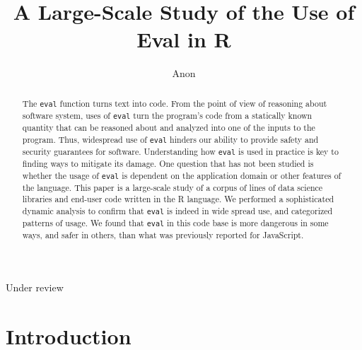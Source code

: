 \documentclass[USenglish,cleveref, autoref, thm-restate]{lipics-v2019}
\newcommand{\eval}{\texttt{eval}\xspace}
\begin{document}
\title{A Large-Scale Study of the Use of Eval in R}


\author{Anon}{Under review}{}{}{}

\EventLogo{}


\maketitle

\begin{abstract}
  The \eval function turns text into code. From the point of view of
  reasoning about software system, uses of \eval turn the program's code
  from a statically known quantity that can be reasoned about and analyzed
  into one of the inputs to the program. Thus, widespread use of \eval
  hinders our ability to provide safety and security guarantees for
  software. Understanding how \eval is used in practice is key to finding
  ways to mitigate its damage. One question that has not been studied is
  whether the usage of \eval is dependent on the application domain or other
  features of the language. This paper is a large-scale study of a corpus of
  \CorpusAllCodeRnd lines of data science libraries and end-user code written in
  the R language. We performed a sophisticated dynamic analysis to confirm
  that \eval is indeed in wide spread use, and categorized patterns of
  usage. We found that \eval in this code base is more dangerous in some
  ways, and safer in others, than what was previously reported for
  JavaScript.
\end{abstract}

\section{Introduction}
\end{document}
